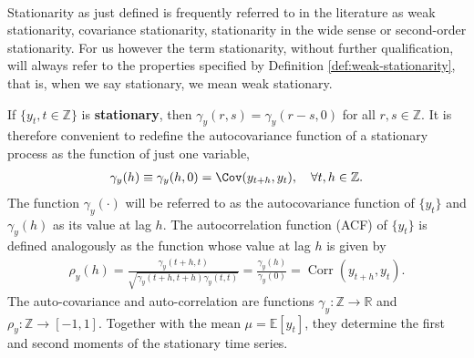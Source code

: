 \begin{remark}
    \
    
    Stationarity as just defined is frequently referred to in the literature as weak stationarity,
    covariance stationarity, stationarity in the wide sense or second-order stationarity.
    For us however the term stationarity, without further qualification, 
    will always refer to the properties specified by Definition \ref{def:weak-stationarity},
    that is, when we say stationary, we mean weak stationary.
\end{remark}

If $\{y_t, t \in \mathbb{Z}\}$ is \textbf{stationary}, then $\gamma_y(r,s) = \gamma_y(r-s, 0)$ for all $r,s \in \mathbb{Z}$.
It is therefore convenient to redefine the autocovariance function of a stationary
process as the function of just one variable,
\begin{gather*}
    \gamma_y(h) \equiv \gamma_y(h, 0) = \Cov(y_{t+h}, y_t), \quad \forall t, h \in \mathbb{Z}.
\end{gather*}
The function $\gamma_y(\cdot)$ will be referred to as the autocovariance function of $\{y_t\}$
and $\gamma_y(h)$ as its value at lag $h$. The autocorrelation function (ACF) of $\{y_t\}$
is defined analogously as the function whose value at lag $h$ is given by
\begin{gather*}
    \rho_y(h) = \frac{\gamma_y(t+h, t)}{\sqrt{\gamma_y(t+h, t+h) \gamma_y(t,t)} } = \frac{\gamma_y(h)}{\gamma_y(0)} = \operatorname{Corr}(y_{t+h}, y_t).
\end{gather*}
The auto-covariance and auto-correlation are functions $\gamma_y: \mathbb{Z} \to \mathbb{R}$ and $\rho_y: \mathbb{Z} \to [-1,1].$
Together with the mean $\mu = \mathbb{E}[y_t]$, they determine
the first and second moments of the stationary time series. 



